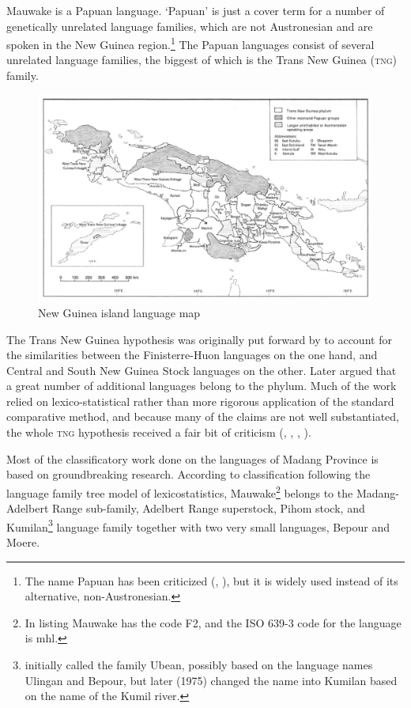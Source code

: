 Mauwake is a Papuan language. `Papuan' is just a cover term for a number of genetically unrelated language families, which are not Austronesian and are spoken in the New Guinea region.\footnote{The name Papuan has been criticized (\citealt{Capell1969}, \citealt{Haiman1979}), but it is widely used instead of its alternative, non-Austronesian.} The Papuan languages consist of several unrelated language families, the biggest of which is the Trans New Guinea (\textsc{tng}) family.  


\begin{figure}
\caption{New Guinea island language map \citep[34 Map~2]{Ross2005}}
\label{map:2:NewGuineamap}
\includegraphics[width=\textwidth]{figures/1-new_guinea_island_language_map.jpeg}
\end{figure}

The Trans New Guinea hypothesis was originally put forward by \citet{McElhanonEtAL1970} to account for the similarities between the Finisterre-Huon languages on the one hand, and Central and South New Guinea Stock languages on the other. Later \citet{Wurm1975} argued that a great number of additional languages belong to the phylum.  Much of the work relied on lexico-statistical rather than more rigorous application of the standard comparative method, and because many of the claims are not well substantiated, the whole \textsc{tng} hypothesis received a fair bit of criticism (\citealt{Lang1976}, \citealt{Haiman1979}, \citealt{Foley1986}, \citealt{Pawley1995}).

Most of the classificatory work done on the languages of Madang Province is based on \citet{ZGraggen1971,ZGraggen1975} groundbreaking research.  According to  classification following the language family tree model of lexicostatistics, Mauwake\footnote{In  listing Mauwake has the code F2, and the ISO 639-3 code for the language is mhl.} belongs to the Madang-Adelbert Range sub-family, Adelbert Range superstock, Pihom stock, and Kumilan\footnote{\citet{ZGraggen1971} initially called the family Ubean, possibly based on the language names Ulingan and Bepour, but later (1975) changed the name into Kumilan based on the name of the Kumil river.} language family together with two very small languages, Bepour and Moere. 




